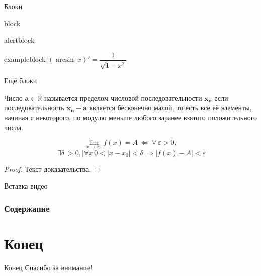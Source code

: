 \documentclass{beamer}[aspectratio=169]
\begin{document}
\begin{frame}{Блоки}
\begin{block}{block}

\end{block}
\begin{alertblock}{alertblock}
\end{alertblock}
\begin{exampleblock}{exampleblock}
$ (\arcsin \ x)' = \dfrac{1}{\sqrt{1 - x^2}}  $
\end{exampleblock}

\end{frame}

\begin{frame}{Ещё блоки}

  \begin{definition}
Число $\mathbf{ a \in \mathbb{R}}  $  называется пределом числовой последовательности $\mathbf{{x_{n}}}$ если последовательность $ \mathbf{{x_{n}-a}} $ является бесконечно малой, то есть все её элементы, начиная с некоторого, по модулю меньше любого заранее взятого положительного числа.
  \end{definition}

  \begin{theorem}
  
$$\lim_{x \rightarrow x_0}f(x) = A \  \Leftrightarrow \   \forall \ \varepsilon > 0,$$
$$\ \exists \delta \ >0, |\forall x \ 0<|x-x_0|<\delta \ \Rightarrow |f(x) - A|< \varepsilon   $$
  \end{theorem}

   \begin{proof}
     Текст доказательства.
   \end{proof}

\end{frame}








\begin{frame}{Вставка видео}

\end{frame}

\begin{frame}[allowframebreaks]{}
	\frametitle{Содержание}
	\tableofcontents
\end{frame}










\section{Конец}
\begin{frame}{Конец}
\centering
\huge
Спасибо за внимание!

\end{frame}
\end{document}
